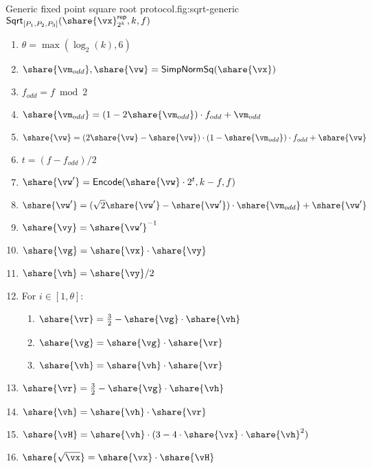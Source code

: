 \begin{Boxfig}{Generic fixed point square root protocol.}{fig:sqrt-generic}
  {$\mathsf{Sqrt}_{[P_1, P_2, P_3]}(\share{\vx}^\mathsf{rep}_{2^k}, k, f)$}
  \begin{enumerate}
    \item $\theta = \max(\log_2(k), 6)$
    \item $\share{\vm_{odd}}, \share{\vw} = \mathsf{SimpNormSq}(\share{\vx})$
    \item $f_{odd} = f \bmod 2$
    \item $\share{\vm_{odd}} = (1 - 2 \share{\vm_{odd}}) \cdot f_{odd} + \vm_{odd}$
    \item $\share{\vw} = (2 \share{\vw} - \share{\vw}) \cdot (1 - \share{\vm_{odd}}) \cdot f_{odd} + \share{\vw}$
    \item $t = (f - f_{odd}) / 2$
    \item $\share{\vw'} = \mathsf{Encode}(\share{\vw} \cdot 2^t, k-f, f)$
    \item $\share{\vw'} = (\sqrt{2} \share{\vw'} - \share{\vw'}) \cdot \share{\vm_{odd}} + \share{\vw'}$
    \item $\share{\vy} = \share{\vw'}^{-1}$
    \item $\share{\vg} = \share{\vx} \cdot \share{\vy}$
    \item $\share{\vh} = \share{\vy} / 2$
    \item For $i \in [1, \theta]$:
    \begin{enumerate}
      \item $\share{\vr} = \frac{3}{2} - \share{\vg} \cdot \share{\vh}$
      \item $\share{\vg} = \share{\vg} \cdot \share{\vr}$
      \item $\share{\vh} = \share{\vh} \cdot \share{\vr}$
    \end{enumerate}
    \item $\share{\vr} = \frac{3}{2} - \share{\vg} \cdot \share{\vh}$
    \item $\share{\vh} = \share{\vh} \cdot \share{\vr}$
    \item $\share{\vH} = \share{\vh} \cdot (3 - 4 \cdot \share{\vx} \cdot \share{\vh}^2)$
    \item $\share{\sqrt{\vx}} = \share{\vx} \cdot \share{\vH}$
  \end{enumerate}
\end{Boxfig}